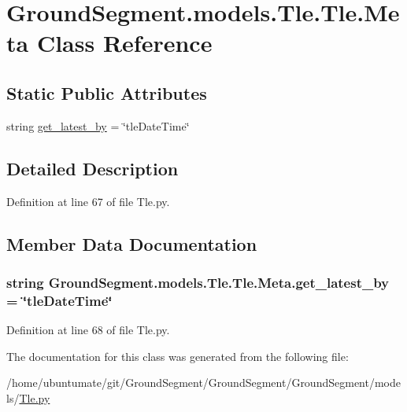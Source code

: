 \hypertarget{class_ground_segment_1_1models_1_1_tle_1_1_tle_1_1_meta}{}\section{Ground\+Segment.\+models.\+Tle.\+Tle.\+Meta Class Reference}
\label{class_ground_segment_1_1models_1_1_tle_1_1_tle_1_1_meta}
\subsection*{Static Public Attributes}
\begin{DoxyCompactItemize}
\item 
string \hyperlink{class_ground_segment_1_1models_1_1_tle_1_1_tle_1_1_meta_a4b90de3b4688d9ff38172b5318c4be66}{get\+\_\+latest\+\_\+by} = \char`\"{}tle\+Date\+Time\char`\"{}
\end{DoxyCompactItemize}


\subsection{Detailed Description}


Definition at line 67 of file Tle.\+py.



\subsection{Member Data Documentation}
\hypertarget{class_ground_segment_1_1models_1_1_tle_1_1_tle_1_1_meta_a4b90de3b4688d9ff38172b5318c4be66}{}
\subsubsection[{get\+\_\+latest\+\_\+by}]{\setlength{\rightskip}{0pt plus 5cm}string Ground\+Segment.\+models.\+Tle.\+Tle.\+Meta.\+get\+\_\+latest\+\_\+by = \char`\"{}tle\+Date\+Time\char`\"{}\hspace{0.3cm}{\ttfamily [static]}}\label{class_ground_segment_1_1models_1_1_tle_1_1_tle_1_1_meta_a4b90de3b4688d9ff38172b5318c4be66}


Definition at line 68 of file Tle.\+py.



The documentation for this class was generated from the following file\+:\begin{DoxyCompactItemize}
\item 
/home/ubuntumate/git/\+Ground\+Segment/\+Ground\+Segment/\+Ground\+Segment/models/\hyperlink{_tle_8py}{Tle.\+py}\end{DoxyCompactItemize}
